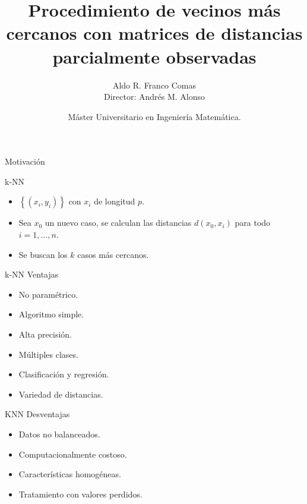 \documentclass[10pt]{beamer}
\title[] %
{\huge {Procedimiento de vecinos más cercanos con matrices de distancias parcialmente observadas}}
\author[Aldo R. Franco Comas] %
{\Large {Aldo R. Franco Comas}\\ 
\vspace{1cm}
{Director: Andrés M. Alonso}}
\institute[UC3M]
\date[Septiembre, 2018] %
{Máster Universitario en Ingeniería Matemática.}
\begin{document}
\begin{frame}
\titlepage
\end{frame}

\begin{frame}{Motivación}

\begin{block}{k-NN}
\begin{itemize}
    \item $\left\lbrace (x_i,y_i) \right\rbrace$ con $x_i$ de longitud $p$.
    \item Sea $x_{0}$ un nuevo caso, se calculan las distancias $d(x_0,x_i)$ para todo $i=1,...,n$.
    \item Se buscan los $k$ casos más cercanos.
\end{itemize}
\end{block}

\begin{block}{k-NN Ventajas}
	\begin{multicols}{2}
		\begin{itemize}
		\item No paramétrico.
		\item Algoritmo simple.
		\item Alta precisión.
		\item Múltiples clases.
		\item Clasificación y regresión.
		\item Variedad de distancias.
		\end{itemize}
	\end{multicols}
\end{block}

\begin{block}{KNN Desventajas}
	\begin{multicols}{2}
		\begin{itemize}
			\item Datos no balanceados.
			\item Computacionalmente costoso.
			\item Características homogéneas.
			\item Tratamiento con valores perdidos.
		\end{itemize}
	\end{multicols}
\end{block}

\end{frame}
\end{document}
